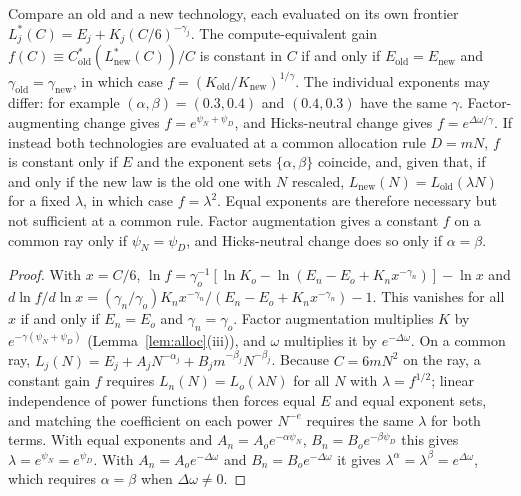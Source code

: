 \begin{corollary}\label{cor:ceg}
Compare an old and a new technology, each evaluated on its own frontier $L^*_j(C)=E_j+K_j(C/6)^{-\gamma_j}$. The
compute-equivalent gain $f(C)\equiv C^*_{\mathrm{old}}(L^*_{\mathrm{new}}(C))/C$ is constant in $C$ if and only if
$E_{\mathrm{old}}=E_{\mathrm{new}}$ and $\gamma_{\mathrm{old}}=\gamma_{\mathrm{new}}$, in which case
$f=(K_{\mathrm{old}}/K_{\mathrm{new}})^{1/\gamma}$. The individual exponents may differ: for example $(\alpha,\beta)=(0.3,0.4)$
and $(0.4,0.3)$ have the same $\gamma$. Factor-augmenting change gives $f=e^{\psi_N+\psi_D}$, and Hicks-neutral change gives
$f=e^{\Delta\omega/\gamma}$. If instead both technologies are evaluated at a common allocation rule $D=mN$, $f$ is constant
only if $E$ and the exponent sets $\{\alpha,\beta\}$ coincide, and, given that, if and only if the new law is the old one
with $N$ rescaled, $L_{\mathrm{new}}(N)=L_{\mathrm{old}}(\lambda N)$ for a fixed $\lambda$, in which case $f=\lambda^2$. Equal exponents
are therefore necessary but not sufficient at a common rule. Factor augmentation gives a constant $f$ on a common ray only if
$\psi_N=\psi_D$, and Hicks-neutral change does so only if $\alpha=\beta$.
\end{corollary}

\begin{proof}
With $x=C/6$, $\ln f=\gamma_o^{-1}[\ln K_o-\ln(E_n-E_o+K_nx^{-\gamma_n})]-\ln x$ and
$d\ln f/d\ln x=(\gamma_n/\gamma_o)K_nx^{-\gamma_n}/(E_n-E_o+K_nx^{-\gamma_n})-1$. This vanishes for all $x$ if and only if
$E_n=E_o$ and $\gamma_n=\gamma_o$. Factor augmentation multiplies $K$ by $e^{-\gamma(\psi_N+\psi_D)}$ (Lemma~\ref{lem:alloc}(iii)),
and $\omega$ multiplies it by $e^{-\Delta\omega}$. On a common ray, $L_j(N)=E_j+A_jN^{-\alpha_j}+B_jm^{-\beta_j}N^{-\beta_j}$.
Because $C=6mN^2$ on the ray, a constant gain $f$ requires $L_n(N)=L_o(\lambda N)$ for all $N$ with $\lambda=f^{1/2}$;
linear independence of power functions then forces equal $E$ and equal exponent sets, and matching the coefficient on each
power $N^{-e}$ requires the same $\lambda$ for both terms. With equal exponents and $A_n=A_oe^{-\alpha\psi_N}$,
$B_n=B_oe^{-\beta\psi_D}$ this gives $\lambda=e^{\psi_N}=e^{\psi_D}$. With $A_n=A_oe^{-\Delta\omega}$ and $B_n=B_oe^{-\Delta\omega}$ it
gives $\lambda^{\alpha}=\lambda^{\beta}=e^{\Delta\omega}$, which requires $\alpha=\beta$ when $\Delta\omega\neq0$.
\end{proof}

